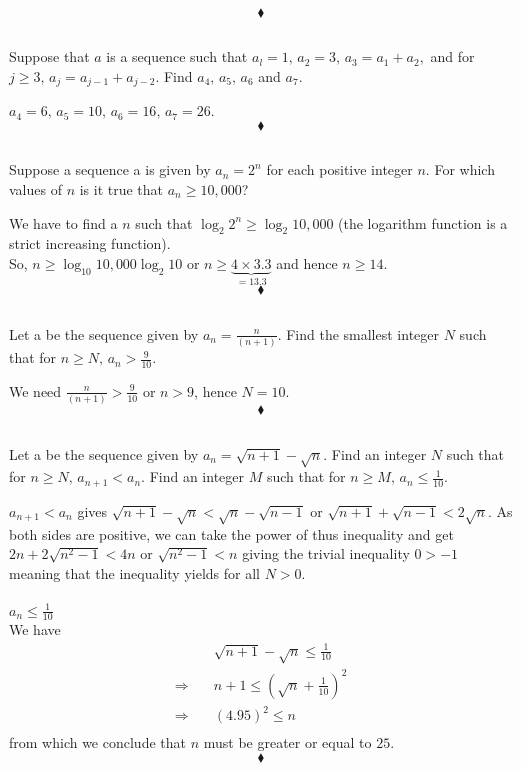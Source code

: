 $$\blacklozenge$$

\subsection{}
\begin{tcolorbox}
Suppose that $a$ is a sequence such that $a_l = 1,\, a_2 = 3,\, a_3 = a_1+a_2,$ and for $j \ge 3,\, a_j = a_{j-1}+a_{j-2}$. Find $a_4,\, a_5,\, a_6$ and $a_7$.
\end{tcolorbox}
$$ $$
$a_4=6,\,a_5=10,\,a_6=16,\,a_7=26$.
$$\blacklozenge$$

\subsection{}
\begin{tcolorbox}
Suppose a sequence a is given by $a_n = 2^n$ for each positive integer $n$. For which values of $n$ is it true that $a_n\ge 10,000$?
\end{tcolorbox}
$$ $$
We have to find a $n$ such that $\log_2 2^n \ge \log_2 10,000$ (the logarithm function is a strict increasing function). \\
So, $n\ge \log_{10} 10,000 \log_2 10$ or $n\ge \underbrace{4\times 3.3}_{=13.3}$ and hence $n\ge 14$.
$$\blacklozenge$$

\subsection{}
\begin{tcolorbox}
Let a be the sequence given by $a_n = \frac{n}{ (n + 1)}$. Find the smallest integer $N$ such that for $n\ge N,\, a_n > \frac{9}{10}$.
\end{tcolorbox}
$$ $$
We need $\frac{n}{ (n + 1) }> \frac{9}{10}$ or $n> 9$, hence $N=10$.
$$\blacklozenge$$

\subsection{}
\begin{tcolorbox}
Let a be the sequence given by $a_n= \sqrt{n+1} -\sqrt{n}$. Find an integer $N$ such that for $n\ge  N,\, a_{n+1} < a_n$. Find an integer $M$ such that for $n\ge M, \, a_n\le \frac{1}{10}$.
\end{tcolorbox}
$$ $$
$a_{n+1} < a_n$ gives $\sqrt{n+1} -\sqrt{n} < \sqrt{n} -\sqrt{n-1}$ or $\sqrt{n+1}+\sqrt{n-1} < 2\sqrt{n} $. As both sides are positive, we can take the power of thus inequality and get $2n+2\sqrt{n^2-1} < 4n $ or $\sqrt{n^2-1} < n $ giving the trivial inequality $0> -1$ meaning that the inequality yields for all $N>0$.\\\\
$a_n\le \frac{1}{10}$\\
We have 
\begin{align*}
&\sqrt{n+1} -\sqrt{n}\le \frac{1}{10}\\
\Rightarrow\quad & n+1\le \left(\sqrt{n}+ \frac{1}{10}\right)^2\\
\Rightarrow\quad & (4.95)^2 \le n\\
\end{align*}
from which we conclude that $n$ must be greater or equal to $25$.
$$\blacklozenge$$

